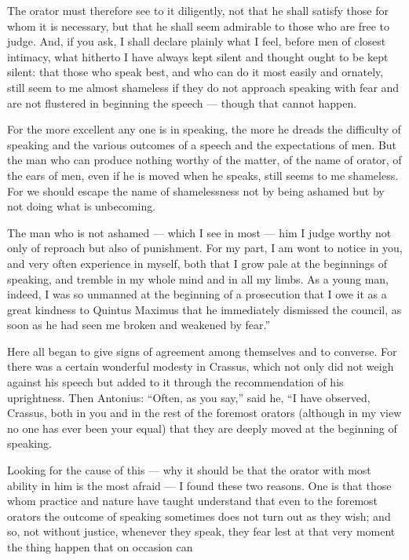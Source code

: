  The orator must therefore see to it diligently, not that he shall satisfy those for whom it is necessary, but that he shall seem admirable to those who are free to judge. And, if you ask, I shall declare plainly what I feel, before men of closest intimacy, what hitherto I have always kept silent and thought ought to be kept silent: that those who speak best, and who can do it most easily and ornately, still seem to me almost shameless if they do not approach speaking with fear and are not flustered in beginning the speech — though that cannot happen.

 For the more excellent any one is in speaking, the more he dreads the difficulty of speaking and the various outcomes of a speech and the expectations of men. But the man who can produce nothing worthy of the matter, of the name of orator, of the ears of men, even if he is moved when he speaks, still seems to me shameless. For we should escape the name of shamelessness not by being ashamed but by not doing what is unbecoming.

 The man who is not ashamed — which I see in most — him I judge worthy not only of reproach but also of punishment. For my part, I am wont to notice in you, and very often experience in myself, both that I grow pale at the beginnings of speaking, and tremble in my whole mind and in all my limbs. As a young man, indeed, I was so unmanned at the beginning of a prosecution that I owe it as a great kindness to Quintus Maximus that he immediately dismissed the council, as soon as he had seen me broken and weakened by fear.''

 Here all began to give signs of agreement among themselves and to converse. For there was a certain wonderful modesty in Crassus, which not only did not weigh against his speech but added to it through the recommendation of his uprightness. Then Antonius: ``Often, as you say,'' said he, ``I have observed, Crassus, both in you and in the rest of the foremost orators (although in my view no one has ever been your equal) that they are deeply moved at the beginning of speaking.

 Looking for the cause of this — why it should be that the orator with most ability in him is the most afraid — I found these two reasons. One is that those whom practice and nature have taught understand that even to the foremost orators the outcome of speaking sometimes does not turn out as they wish; and so, not without justice, whenever they speak, they fear lest at that very moment the thing happen that on occasion can

